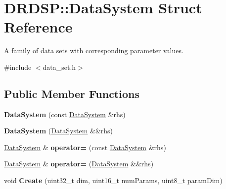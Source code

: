 \hypertarget{struct_d_r_d_s_p_1_1_data_system}{\section{D\-R\-D\-S\-P\-:\-:Data\-System Struct Reference}
\label{struct_d_r_d_s_p_1_1_data_system}
}


A family of data sets with corresponding parameter values.  




{\ttfamily \#include $<$data\-\_\-set.\-h$>$}

\subsection*{Public Member Functions}
\begin{DoxyCompactItemize}
\item 
\hypertarget{struct_d_r_d_s_p_1_1_data_system_a3932e5e343441907adbe5c88e9aa6c2f}{{\bfseries Data\-System} (const \hyperlink{struct_d_r_d_s_p_1_1_data_system}{Data\-System} \&rhs)}\label{struct_d_r_d_s_p_1_1_data_system_a3932e5e343441907adbe5c88e9aa6c2f}

\item 
\hypertarget{struct_d_r_d_s_p_1_1_data_system_afcb0f2f09041d9c5ce8ebf35babb0782}{{\bfseries Data\-System} (\hyperlink{struct_d_r_d_s_p_1_1_data_system}{Data\-System} \&\&rhs)}\label{struct_d_r_d_s_p_1_1_data_system_afcb0f2f09041d9c5ce8ebf35babb0782}

\item 
\hypertarget{struct_d_r_d_s_p_1_1_data_system_a5294fc0909f5346ea51016efa37b9fc5}{\hyperlink{struct_d_r_d_s_p_1_1_data_system}{Data\-System} \& {\bfseries operator=} (const \hyperlink{struct_d_r_d_s_p_1_1_data_system}{Data\-System} \&rhs)}\label{struct_d_r_d_s_p_1_1_data_system_a5294fc0909f5346ea51016efa37b9fc5}

\item 
\hypertarget{struct_d_r_d_s_p_1_1_data_system_aea74462f4d4dcabd599d85ec2db9a11d}{\hyperlink{struct_d_r_d_s_p_1_1_data_system}{Data\-System} \& {\bfseries operator=} (\hyperlink{struct_d_r_d_s_p_1_1_data_system}{Data\-System} \&\&rhs)}\label{struct_d_r_d_s_p_1_1_data_system_aea74462f4d4dcabd599d85ec2db9a11d}

\item 
\hypertarget{struct_d_r_d_s_p_1_1_data_system_a22dbffce42551aa598d9b5b763253e21}{void {\bfseries Create} (uint32\-\_\-t dim, uint16\-\_\-t num\-Params, uint8\-\_\-t param\-Dim)}\label{struct_d_r_d_s_p_1_1_data_system_a22dbffce42551aa598d9b5b763253e21}


\end{DoxyCompactItemize}
